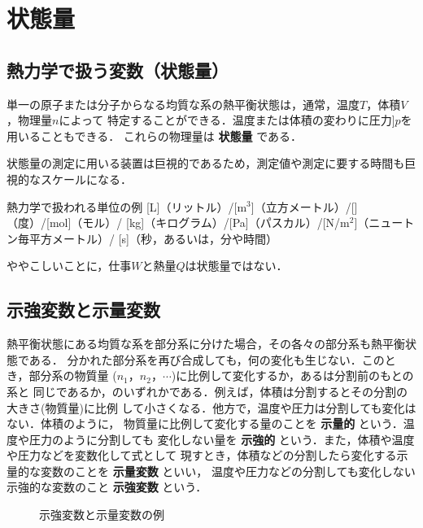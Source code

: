 \section{状態量}
        \subsection{熱力学で扱う変数（状態量）}
        単一の原子または分子からなる均質な系の熱平衡状態は，通常，温度$T$，体積$V$，物理量$n$によって
        特定することができる．温度または体積の変わりに圧力]$p$を用いることもできる．
        これらの物理量は \textbf{状態量} である．

        状態量の測定に用いる装置は巨視的であるため，測定値や測定に要する時間も巨視的なスケールになる．

        \begin{itembox}[l]{熱力学で扱われる単位の例}
            [L]（リットル）/[m${}^{3}$]（立方メートル）/[\circC]（度）/[mol]（モル）/
            [kg]（キログラム）/[Pa]（パスカル）/[N/m${}^{2}$]（ニュートン毎平方メートル）/
            [s]（秒，あるいは，分や時間）
        \end{itembox}

        ややこしいことに，仕事$W$と熱量$Q$は状態量ではない．

        \subsection{示強変数と示量変数}
            熱平衡状態にある均質な系を部分系に分けた場合，その各々の部分系も熱平衡状態である．
            分かれた部分系を再び合成しても，何の変化も生じない．このとき，部分系の物質量
            (${n}_{1}$，${n}_{2}$，$\cdots$)に比例して変化するか，あるは分割前のもとの系と
            同じであるか，のいずれかである．例えば，体積は分割するとその分割の大きさ(物質量)に比例
            して小さくなる．他方で，温度や圧力は分割しても変化はない．体積のように，
            物質量に比例して変化する量のことを \textbf{示量的} という．温度や圧力のように分割しても
            変化しない量を \textbf{示強的} という．また，体積や温度や圧力などを変数化して式として
            現すとき，体積などの分割したら変化する示量的な変数のことを \textbf{示量変数} といい，
            温度や圧力などの分割しても変化しない示強的な変数のこと \textbf{示強変数} という．
            \begin{figure}[hbt]
                \begin{center}
                    \caption{示強変数と示量変数の例}
                    \label{fig:shikyouhensu_siryohensu}
                \end{center}
            \end{figure}

